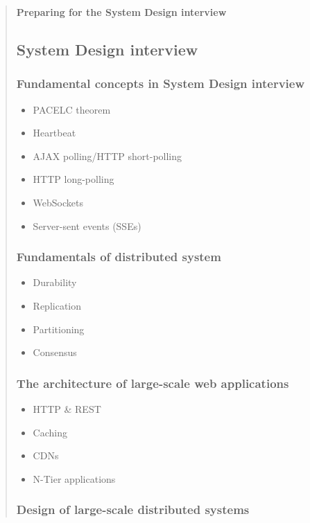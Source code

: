 \begin{quote}
\textbf{Preparing for the System Design interview}

\subsection{System Design interview}

\subsubsection{Fundamental concepts in System Design interview}

\begin{itemize}
\item PACELC theorem
\item Heartbeat
\item AJAX polling/HTTP short-polling
\item HTTP long-polling
\item WebSockets
\item Server-sent events (SSEs)
\end{itemize}
\subsubsection{Fundamentals of distributed system}

\begin{itemize}
\item Durability
\item Replication
\item Partitioning
\item Consensus
\end{itemize}
\subsubsection{The architecture of large-scale web applications}

\begin{itemize}
\item HTTP \& REST
\item Caching
\item CDNs
\item N-Tier applications
\end{itemize}
\subsubsection{Design of large-scale distributed systems}

\end{quote}

